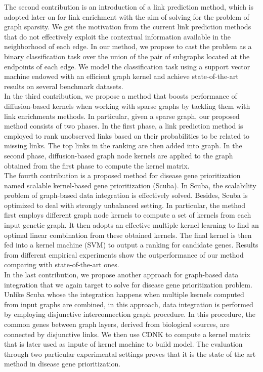 The second contribution is an introduction of a link prediction method, which is adopted later on for link enrichment with the aim of solving for the problem of graph sparsity. We get the motivation from the current link prediction methods that do not effectively exploit the contextual information available in the neighborhood of each edge. In our method, we propose to cast the problem as a binary classification task over the union of the pair of subgraphs located at the endpoints of each edge. We model the classification task using a support vector machine endowed with an efficient graph kernel
and achieve state-of-the-art results on several benchmark datasets.\\

In the third contribution, we propose a method that boosts performance of diffusion-based kernels when working with sparse graphs by tackling them with link enrichments methods. In particular, given a sparse graph, our proposed method consists of two phases. In the first phase, a link prediction method is employed to rank unobserved links based on their probabilities to be related to missing links. The top links in the ranking are then added into graph. In the second phase, diffusion-based graph node kernels are applied to the graph obtained from the first phase to compute the kernel matrix.\\

The fourth contribution is a proposed method for disease gene prioritization named scalable kernel-based gene prioritization (Scuba). In Scuba, the scalability problem of graph-based data integration is effectively solved. Besides, Scuba is optimized to deal with strongly unbalanced setting. In particular, the method first employs different graph node kernels to compute a set of kernels from each input genetic graph. It then adopts an effective multiple kernel learning to find an optimal linear combination from these obtained kernels. The final kernel is then fed into a kernel machine (SVM) to output a ranking for candidate genes. Results from different empirical experiments show the outperformance of our method comparing with state-of-the-art ones.\\

In the last contribution, we propose another approach for graph-based data integration that we again target to solve for disease gene prioritization problem. Unlike Scuba whose the integration happens when multiple kernels computed from input graphs are combined, in this approach, data integration is  performed by employing disjunctive interconnection graph procedure. In this procedure, the common genes between graph layers, derived from biological sources, are connected by disjunctive links. We then use CDNK to compute a kernel matrix that is later used as inpute of kernel machine to build model. The evaluation through two particular experimental settings proves that it is the state of the art method in disease gene prioritization. 
